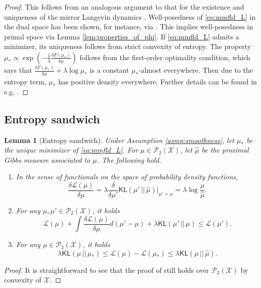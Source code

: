 \documentclass{article}
\newtheorem{lemma}[theorem]{Lemma}
\newcommand{\sep}[0]{\,||\,}
\newcommand{\KL}[0]{\mathsf{KL}}
\begin{document}
\begin{proof}
This follows from an analogous argument to that for the existence and uniqueness of the mirror Langevin dynamics \citep{zhang2020wasserstein,chewi2020mld}. Well-posedness of \eqref{eq:mmfld_L} in the dual space has been shown, for instance, via \citet{rockner2021well}. This implies well-posedness in primal space via Lemma \ref{lem:properties_of_phi}. If \eqref{eq:mmfld_L} admits a minimizer, its uniqueness follows from strict convexity of entropy. The property $\mu_* \propto \exp\left(-\frac{1}{\lambda}\frac{\delta F(\mu_*)}{\delta\mu}\right)$ follows from the first-order optimality condition, which says that $\frac{\delta F(\mu_*)}{\delta\mu} + \lambda \log \mu_* $ is a constant $\mu_*$-almost everywhere. Then due to the entropy term, $\mu_*$ has positive density everywhere. Further details can be found in e.g. \citet{mei2018meanfield,chizat2022meanfield}.
\end{proof}

\subsection{Entropy sandwich}

\begin{lemma}[Entropy sandwich]\label{lem:entropy_sandwich}
    Under Assumption \ref{asmp:smoothness}, let $\mu_*$ be the unique minimizer of \eqref{eq:mmfld_L}. For $\mu\in\mathcal{P}_2(\mathcal{X})$, let $\hat{\mu}$ be the proximal Gibbs measure associated to $\mu$. The following hold.
    \begin{enumerate}
        \item[(i)] In the sense of functionals on the space of probability density functions, \[
        \frac{\delta\mathcal{L}(\mu)}{\delta\mu} = \lambda \frac{\delta}{\delta\mu'}{\KL}(\mu'\sep\hat{\mu})\bigg|_{\mu'=\mu} = \lambda \log\frac{\mu}{\hat{\mu}}.
        \]
        \item[(ii)] For any $\mu,\mu'\in\mathcal{P}_2(\mathcal{X})$, it holds \[
        \mathcal{L}(\mu) + \int \frac{\delta\mathcal{L}(\mu)}{\delta\mu}d(\mu'-\mu) + \lambda{\KL(\mu'\sep\mu)}\le \mathcal{L}(\mu').
        \]
        \item[(iii)] For any $\mu\in\mathcal{P}_2(\mathcal{X})$,   it holds \[
    \lambda{\KL(\mu\sep\mu_*)}\le \mathcal{L}(\mu) - \mathcal{L}
(\mu_*)\le \lambda{\KL(\mu\sep\hat{\mu})}.
\]
    \end{enumerate}
\end{lemma}
\begin{proof}
    It is straightforward to see that the proof of \citet[Proposition 1]{nitanda2022convex} still holds over $\mathcal{P}_2(\mathcal{X})$ by convexity of $\mathcal{X}$.
\end{proof}
\end{document}
